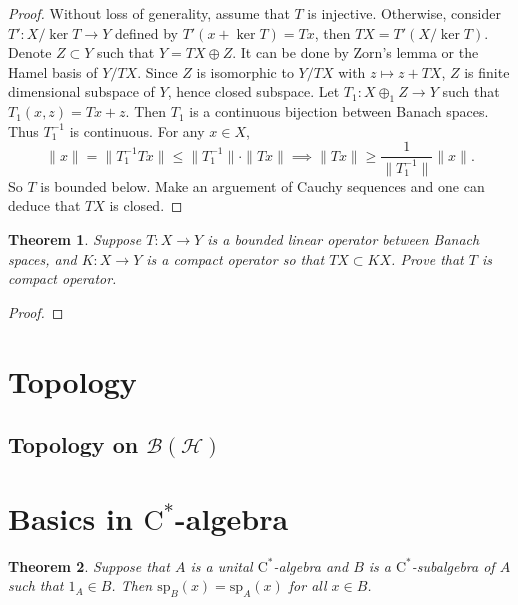 \documentclass{article}
\newtheorem{theorem}{Theorem}[section]
\begin{document}
\begin{proof}
Without loss of generality, assume that $T$ is injective. Otherwise, consider $T':X/\ker T \to Y$ defined by $T'(x+\ker T) = Tx$, then $TX = T'(X/\ker T)$. Denote $Z\subset Y$ such that $Y = TX \oplus Z$. It can be done by Zorn's lemma or the Hamel basis of $Y/TX$. Since $Z$ is isomorphic to $Y/TX$ with $z \mapsto z+TX$, $Z$ is finite dimensional subspace of $Y$, hence closed subspace. Let $T_1 : X \oplus_1 Z \to Y$ such that $T_1 (x,z) = Tx + z$. Then $T_1$ is a continuous bijection between Banach spaces. Thus $T_1^{-1}$ is continuous. For any $x \in X$,
\[
\| x\| = \| T_1^{-1}Tx\| \leq \| T_1^{-1} \| \cdot \| Tx\| \implies \| Tx\| \geq \frac{1}{\| T_1^{-1}\|} \| x\| .
\]
So $T$ is bounded below. Make an arguement of Cauchy sequences and one can deduce that $TX$ is closed.
\end{proof}

\begin{theorem}
Suppose $T:X\to Y$ is a bounded linear operator between Banach spaces, and $K:X\to Y$ is a compact operator so that $TX \subset KX$. Prove that $T$ is compact operator.
\end{theorem}

\begin{proof}
\end{proof}


\section{Topology}

\subsection{Topology on $\mathcal{B}(\mathcal{H})$}


\section{Basics in $\mathrm{C}^*$-algebra}


\begin{theorem}\label{spectrum_coincide}
Suppose that $A$ is a unital $\mathrm{C}^*$-algebra and $B$ is a $\mathrm{C}^*$-subalgebra of $A$ such that $1_A \in B$.
Then $\text{sp}_B (x) = \text{sp}_A (x)$ for all $x \in B$.
\end{theorem}
\end{document}
